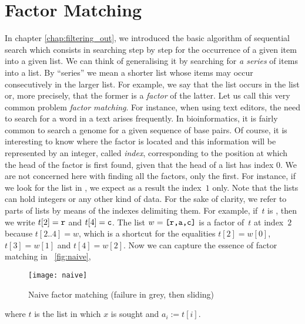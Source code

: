 
\chapter{Factor Matching}

In chapter \vref{chap:filtering_out}, we introduced the basic
algorithm of sequential search which consists in searching step by
step for the occurrence of a given item into a given list. We can
think of generalising it by searching for \emph{a series} of items
into a list. By ``series'' we mean a shorter list whose items may
occur consecutively in the larger list. For example, we say that the
list \erlcode{[c,d]} occurs in the list \erlcode{[a,b,c,d,e]} or, more
precisely, that the former is a \emph{factor} of the latter. Let us
call this very common problem \emph{factor matching}. For instance,
when using text editors, the need to search for a word in a text
arises frequently. In bio\-informatics, it is fairly common to search
a genome for a given sequence of base pairs. Of course, it is
interesting to know where the factor is located and this information
will be represented by an integer, called \emph{index}, corresponding
to the position at which the head of the factor is first found, given
that the head of a list has index \(0\). We are not concerned here
with finding all the factors, only the first. For instance, if we look
for the list \erlcode{[b,r]} in \erlcode{[a,b,r,a,c,a,d,a,b,r,a]}, we
expect as a result the index~\(1\) only. Note that the lists can hold
integers or any other kind of data. For the sake of clarity, we refer
to parts of lists by means of the indexes delimiting them. For
example, if~\(t\) is \erlcode{[a,b,r,a,c,a]}, then we write \({t[2] =
  \texttt{r}}\) and \(t[4] = \texttt{c}\). The list
\(w=\texttt{[r,a,c]}\) is a factor of~\(t\) at index~\(2\) because
\(t[2..4] = w\), which is a shortcut for the equalities \(t[2]=w[0]\),
\(t[3]=w[1]\) and \(t[4]=w[2]\). Now we can capture the essence of
factor matching in \fig~\vref{fig:naive},
\begin{figure}[b]
\centering
\texttt{[image: naive]}
\caption{Naive factor matching (failure in grey, then sliding)
\label{fig:naive}}
\end{figure}
where \(t\) is the list in which \(x\) is sought and \(a_i :=
t[i]\).
